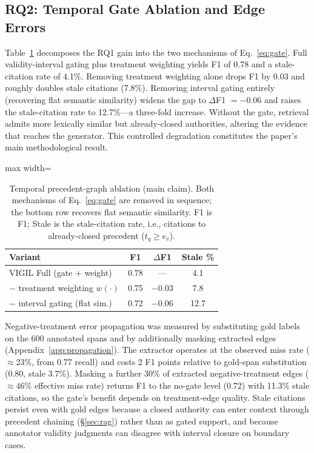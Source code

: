 \subsection{RQ2: Temporal Gate Ablation and Edge Errors}
\label{sec:rq2}

Table~\ref{tab:ablation} decomposes the RQ1 gain into the two mechanisms of Eq.~\eqref{eq:gate}.
Full validity-interval gating plus treatment weighting yields \plre{} F1 of 0.78 and a stale-citation rate of 4.1\%.
Removing treatment weighting alone drops F1 by 0.03 and roughly doubles stale citations (7.8\%).
Removing interval gating entirely (recovering flat semantic similarity) widens the gap to $\Delta$F1 $= -0.06$ and raises the stale-citation rate to 12.7\%---a three-fold increase.
Without the gate, retrieval admits more lexically similar but already-closed authorities, altering the evidence that reaches the generator.
This controlled degradation constitutes the paper's main methodological result.

\begin{table}[t]
\centering
\small
\setlength{\tabcolsep}{4pt}
\begin{adjustbox}{max width=\columnwidth}
\begin{tabular}{lccc}
\toprule
Variant & F1 & $\Delta$F1 & Stale \% \\
\midrule
VIGIL Full (gate + weight) & 0.78 & --- & 4.1 \\
$-$ treatment weighting $w(\cdot)$ & 0.75 & $-0.03$ & 7.8 \\
$-$ interval gating (flat sim.) & 0.72 & $-0.06$ & 12.7 \\
\bottomrule
\end{tabular}
\end{adjustbox}
\caption{Temporal precedent-graph ablation (main claim).
Both mechanisms of Eq.~\eqref{eq:gate} are removed in sequence; the bottom row recovers flat semantic similarity.
F1 is \plre{} F1; Stale is the stale-citation rate, i.e., citations to already-closed precedent ($t_q \ge e_v$).}
\label{tab:ablation}
\end{table}

Negative-treatment error propagation was measured by substituting gold labels on the 600 annotated spans and by additionally masking extracted edges (Appendix~\ref{app:propagation}).
The extractor operates at the observed miss rate ($\approx$23\%, from 0.77 recall) and costs 2 \plre{} F1 points relative to gold-span substitution (0.80, stale 3.7\%).
Masking a further 30\% of extracted negative-treatment edges ($\approx$46\% effective miss rate) returns F1 to the no-gate level (0.72) with 11.3\% stale citations, so the gate's benefit depends on treatment-edge quality.
Stale citations persist even with gold edges because a closed authority can enter context through precedent chaining (\S\ref{sec:rag}) rather than as gated support, and because annotator validity judgments can disagree with interval closure on boundary cases.

